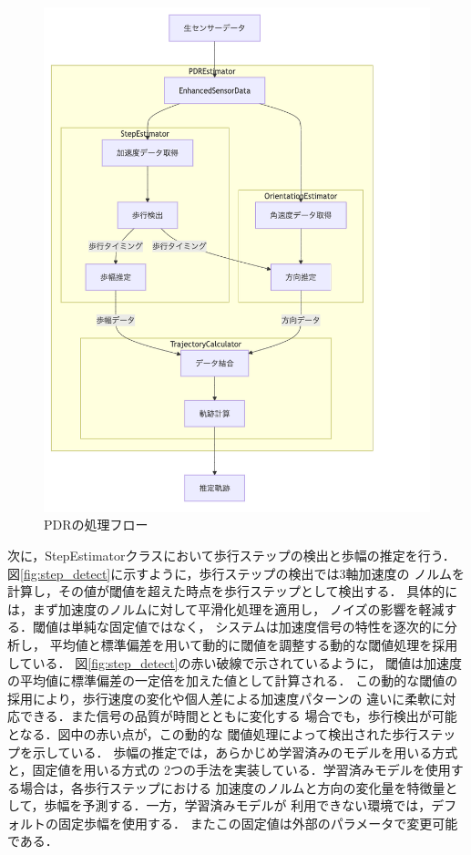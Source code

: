 \begin{figure}[H]
    \centering
    \includegraphics[width=\linewidth]{../image/pdr_flow2.png}
    \caption{PDRの処理フロー}
    \label{fig:pdr-flow}
\end{figure}


次に，StepEstimatorクラスにおいて歩行ステップの検出と歩幅の推定を行う．
図\ref{fig:step_detect}に示すように，歩行ステップの検出では3軸加速度の
ノルムを計算し，その値が閾値を超えた時点を歩行ステップとして検出する．
具体的には，まず加速度のノルムに対して平滑化処理を適用し，
ノイズの影響を軽減する．閾値は単純な固定値ではなく，
システムは加速度信号の特性を逐次的に分析し，
平均値と標準偏差を用いて動的に閾値を調整する動的な閾値処理を採用している．
図\ref{fig:step_detect}の赤い破線で示されているように，
閾値は加速度の平均値に標準偏差の一定倍を加えた値として計算される．
この動的な閾値の採用により，歩行速度の変化や個人差による加速度パターンの
違いに柔軟に対応できる．また信号の品質が時間とともに変化する  %
場合でも，歩行検出が可能となる．図中の赤い点が，この動的な
閾値処理によって検出された歩行ステップを示している．
歩幅の推定では，あらかじめ学習済みのモデルを用いる方式と，固定値を用いる方式の
2つの手法を実装している．学習済みモデルを使用する場合は，各歩行ステップにおける
加速度のノルムと方向の変化量を特徴量として，歩幅を予測する．一方，学習済みモデルが
利用できない環境では，デフォルトの固定歩幅を使用する．
またこの固定値は外部のパラメータで変更可能である．

